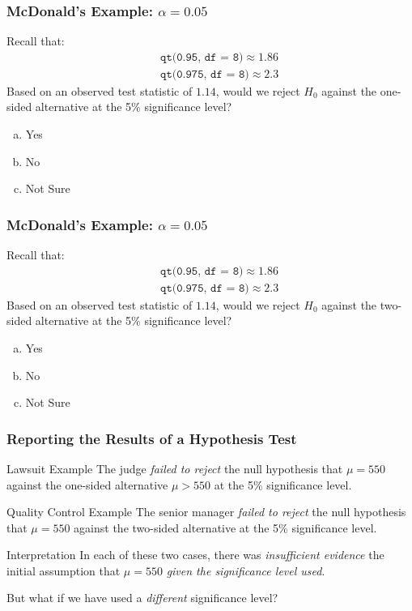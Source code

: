 \documentclass{beamer}
\begin{document}
\begin{frame}[t]
\frametitle{McDonald's Example: $\alpha = 0.05$}
Recall that:
\begin{eqnarray*}
		&&\texttt{qt(0.95, df  = 8)}\approx 1.86\\
		 &&\texttt{qt(0.975, df  = 8)}\approx 2.3
	\end{eqnarray*}
Based on an observed test statistic of $1.14$, would we reject $H_0$ against the one-sided alternative at the 5\% significance level?
\begin{enumerate}[(a)]
	\item Yes
	\item No
	\item Not Sure
\end{enumerate}

\end{frame}
\begin{frame}[t]
\frametitle{McDonald's Example: $\alpha = 0.05$}
Recall that:
\begin{eqnarray*}
		&&\texttt{qt(0.95, df  = 8)}\approx 1.86\\
		 &&\texttt{qt(0.975, df  = 8)}\approx 2.3
	\end{eqnarray*}
Based on an observed test statistic of $1.14$, would we reject $H_0$ against the \alert{two-sided} alternative at the 5\% significance level?
\begin{enumerate}[(a)]
	\item Yes
	\item No
	\item Not Sure
\end{enumerate}

\end{frame}


\begin{frame}
	\frametitle{Reporting the Results of a Hypothesis Test}
	\begin{block}
		{Lawsuit Example}
		The judge \emph{failed to reject} the null hypothesis that $\mu = 550$ against the one-sided alternative $\mu > 550$ at the 5\% significance level.
	\end{block}
	\begin{block}
		{Quality Control Example}
		The senior manager \emph{failed to reject} the null hypothesis that $\mu =550$ against the two-sided alternative at the 5\% significance level.
	\end{block}
	\begin{block}
		{Interpretation}
		In each of these two cases, there was \emph{insufficient evidence} the initial assumption that $\mu = 550$ \emph{given the significance level used}.
	\end{block}
	\alert{But what if we have used a \emph{different} significance level?}
\end{frame}
\end{document}
